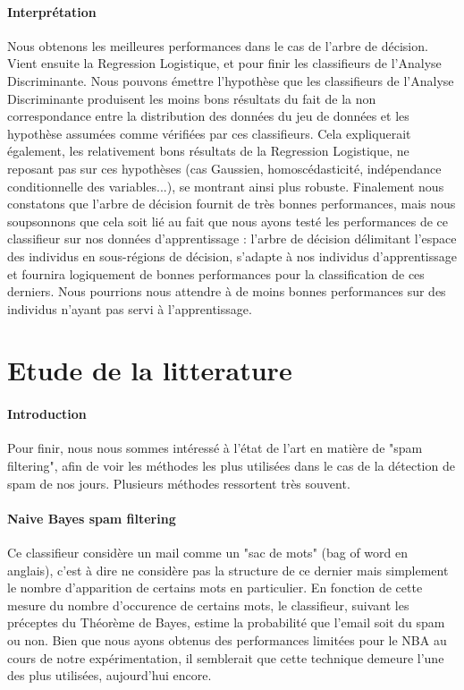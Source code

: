 \documentclass{report}
\begin{document}
\paragraph{Interprétation}
Nous obtenons les meilleures performances dans le cas de l'arbre de décision. Vient ensuite la Regression Logistique, et pour finir les classifieurs de l'Analyse Discriminante. Nous pouvons émettre l'hypothèse que les classifieurs de l'Analyse Discriminante produisent les moins bons résultats du fait de la non correspondance entre la distribution des données du jeu de données et les hypothèse assumées comme vérifiées par ces classifieurs. Cela expliquerait également, les relativement bons résultats de la Regression Logistique, ne reposant pas sur ces hypothèses (cas Gaussien, homoscédasticité, indépendance conditionnelle des variables...), se montrant ainsi plus robuste. Finalement nous constatons que l'arbre de décision fournit de très bonnes performances, mais nous soupsonnons que cela soit lié au fait que nous ayons testé les performances de ce classifieur sur nos données d'apprentissage : l'arbre de décision délimitant l'espace des individus en sous-régions de décision, s'adapte à nos individus d'apprentissage et fournira logiquement de bonnes performances pour la classification de ces derniers. Nous pourrions nous attendre à de moins bonnes performances sur des individus n'ayant pas servi à l'apprentissage.

\section{Etude de la litterature}
\paragraph{Introduction}
Pour finir, nous nous sommes intéressé à l'état de l'art en matière de "spam filtering", afin de voir les méthodes les plus utilisées dans le cas de la détection de spam de nos jours. Plusieurs méthodes ressortent très souvent.

\paragraph{Naive Bayes spam filtering}
Ce classifieur considère un mail comme un "sac de mots" (bag of word en anglais), c'est à dire ne considère pas la structure de ce dernier mais simplement le nombre d'apparition de certains mots en particulier. En fonction de cette mesure du nombre d'occurence de certains mots, le classifieur, suivant les préceptes du Théorème de Bayes, estime la probabilité que l'email soit du spam ou non. Bien que nous ayons obtenus des performances limitées pour le NBA au cours de notre expérimentation, il semblerait que cette technique demeure l'une des plus utilisées, aujourd'hui encore.
\end{document}
